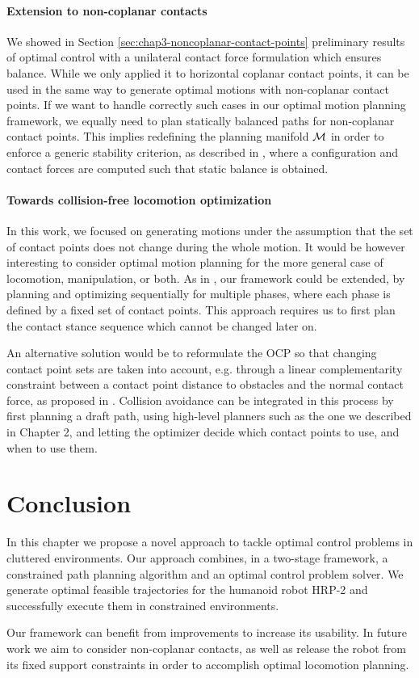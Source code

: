 \paragraph{Extension to non-coplanar contacts}
We showed in Section \ref{sec:chap3-noncoplanar-contact-points}
preliminary results of optimal control with a unilateral contact force
formulation which ensures balance. While we only applied it to
horizontal coplanar contact points, it can be used in the same way to
generate optimal motions with non-coplanar contact points. If we want
to handle correctly such cases in our optimal motion planning
framework, we equally need to plan statically balanced paths for
non-coplanar contact points. This implies redefining the planning
manifold $\mathcal{M}$ in order to enforce a generic stability criterion,
as described in \cite{bretl2006motion}, where a configuration and
contact forces are computed such that static balance is obtained.

\paragraph{Towards collision-free locomotion optimization}
In this work, we focused on generating motions under the assumption
that the set of contact points does not change during the whole
motion. It would be however interesting to consider optimal motion
planning for the more general case of locomotion, manipulation, or
both. As in \cite{lengagne2011generation}, our framework could be
extended, by planning and optimizing sequentially for multiple phases,
where each phase is defined by a fixed set of contact points. This
approach requires us to first plan the contact stance sequence which
cannot be changed later on.

An alternative solution would be to reformulate the OCP so that
changing contact point sets are taken into account, e.g. through a
linear complementarity constraint between a contact point distance to
obstacles and the normal contact force, as proposed in
\cite{posa2012direct, tassa2012synthesis,
  mordatch2012discovery}. Collision avoidance can be integrated in
this process by first planning a draft path, using high-level planners
such as the one we described in Chapter 2, and letting the optimizer
decide which contact points to use, and when to use them.

\section{Conclusion}
In this chapter we propose a novel approach to tackle optimal control
problems in cluttered environments. Our approach combines, in a
two-stage framework, a constrained path planning algorithm and an
optimal control problem solver. We generate optimal feasible
trajectories for the humanoid robot HRP-2 and successfully execute
them in constrained environments.

Our framework can benefit from improvements to increase its
usability. In future work we aim to consider non-coplanar contacts, as
well as release the robot from its fixed support constraints in order
to accomplish optimal locomotion planning.
